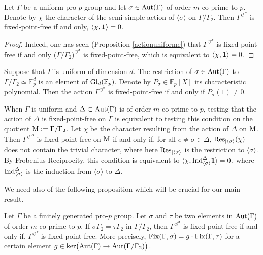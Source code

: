 \documentclass[12pt,a4paper,twoside,english]{smfart}
\def\fq{{\mathbb F}}
\def\Gl{{\rm Gl}}
\def\Aut{{\rm Aut}}
\def\Fix{{\rm Fix}}
\def\ker{{\rm ker}}
\def\Res{{\rm Res}}
\def\Ind{{\rm Ind}}
\def\1{{\bf 1}}
\def\ACT#1#2{{\displaystyle{#1^{\circlearrowleft^#2}}}}
\def\act#1{{\displaystyle{#1^{\circlearrowleft^\sigma}}}}
\begin{document}
  
  \begin{coro}
  Let $\Gamma$ be a uniform pro-$p$ group and let $\sigma \in \Aut(\Gamma)$ of order  $m$ co-prime to $p$. Denote by $\chi$ the character of the semi-simple action of $\langle \sigma \rangle$ on $\Gamma/\Gamma_2$.
  Then $\act{\Gamma}$ is fixed-point-free if and only, $\langle \chi, \1 \rangle =0$.
  \end{coro}
  
  \begin{proof}
  Indeed, one has seen (Proposition \ref{actionuniforme}) that  $\act{\Gamma}$ is fixed-point-free if and only $\act{\big(\Gamma/\Gamma_2\big)}$ is fixed-point-free, which is equivalent to $\langle \chi, \1 \rangle =0$.
  \end{proof}
  
   
  \begin{rema} Suppose that $\Gamma$ is uniform of dimension $d$.
  The restriction of $\sigma \in \Aut(\Gamma)$ to $\Gamma/\Gamma_2 \simeq \fq_p^d$ is an element of $\Gl_d(\fq_p)$. Denote by $P_\sigma\in \fq_p[X] $ its characteristic polynomial. Then 
  the action $\act{\Gamma}$ is fixed-point-free if and only if $P_\sigma(1) \neq 0$.
  \end{rema}
  
  
  \begin{rema}
When $\Gamma$ is uniform and $\Delta \subset  \Aut(\Gamma)$ is of order $m$ co-prime to $p$, testing that the action of $\Delta$ is fixed-point-free on $\Gamma$ is equivalent to testing this condition on the quotient ${\rm M}:=\Gamma/\Gamma_2$. Let $\chi$ be the character resulting from the action of $\Delta$ on ${\rm M}$.  
 Then $\ACT{\Gamma}{\Delta}$  is fixed point-free on ${\rm M}$ if and only if, for all $e \neq \sigma \in \Delta$,  $\Res_{|\langle \sigma \rangle}(\chi)$ does not contain the trivial character, where here $\Res_{|\langle \sigma \rangle}$ is the restriction to $\langle \sigma \rangle$.  By Frobenius Reciprocity, this condition is equivalent to $\langle \chi, \Ind_{\langle \sigma \rangle }^\Delta \1\rangle =0$, 
where $\Ind_{\langle \sigma \rangle }^\Delta$ is the induction from $\langle \sigma \rangle$ to $\Delta$.
\end{rema}
  
    
  We need also of the following proposition which will be crucial for our main result.
  
  \begin{prop}\label{conjugueauto}
  Let  $\Gamma$ be a finitely generated pro-$p$ group.
  Let $\sigma$ and $\tau$ be two elements in $\Aut(\Gamma)$ of order $m$ co-prime to $p$. If $\sigma \Gamma_2 = \tau  \Gamma_2$ in $\Gamma/\Gamma_2$, then 
  $\displaystyle{\Gamma^{\circlearrowleft^\sigma}}$ is fixed-point-free if and only if, 
  $\displaystyle{\Gamma^{\circlearrowleft^\tau}}$ is fixed-point-free.
 More precisely,  $\Fix(\Gamma,\sigma) = g\cdot \Fix(\Gamma,\tau)$ for a certain element  $g \in \ker\big(\Aut(\Gamma)\rightarrow \Aut(\Gamma/\Gamma_2)\big)$.
 \end{prop}
 
\end{document}
